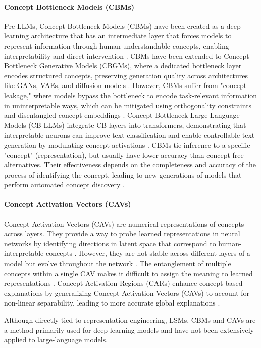 \paragraph{Concept Bottleneck Models (CBMs)} 

Pre-LLMs, Concept Bottleneck Models (CBMs) have been created as a deep learning architecture that has an intermediate layer that forces models to represent information through human-understandable concepts, enabling interpretability and direct intervention \cite{koh2020concept}. CBMs have been extended to Concept Bottleneck Generative Models (CBGMs), where a dedicated bottleneck layer encodes structured concepts, preserving generation quality across architectures like GANs, VAEs, and diffusion models \cite{ismail2023concept}. However, CBMs suffer from "concept leakage," where models bypass the bottleneck to encode task-relevant information in uninterpretable ways, which can be mitigated using orthogonality constraints and disentangled concept embeddings \cite{mahinpei2021promises, ismail2023concept}. Concept Bottleneck Large-Language Models (CB-LLMs) integrate CB layers into transformers, demonstrating that interpretable neurons can improve text classification and enable controllable text generation by modulating concept activations \cite{sun2024concept}. CBMs tie inference to a specific "concept" (representation), but usually have lower accuracy than concept-free alternatives. Their effectiveness depends on the completeness and accuracy of the process of identifying the concept, leading to new generations of models that perform automated concept discovery \cite{zarlenga2022concept, ismail2023concept, kim24}. 

\paragraph{Concept Activation Vectors (CAVs)}  

Concept Activation Vectors (CAVs) are numerical representations of concepts across layers. They provide a way to probe learned representations in neural networks by identifying directions in latent space that correspond to human-interpretable concepts \cite{nicolson24explain}. However, they are not stable across different layers of a model but evolve throughout the network \cite{nicolson24explain}. The entanglement of multiple concepts within a single CAV makes it difficult to assign the meaning to learned representations \cite{nicolson24explain, schmalwasser24}. Concept Activation Regions (CARs) enhance concept-based explanations by generalizing Concept Activation Vectors (CAVs) to account for non-linear separability, leading to more accurate global explanations \cite{crabbe2022concept}.  

Although directly tied to representation engineering, LSMs, CBMs and CAVs are a method primarily used for deep learning models \cite{desantis24, schmalwasser24} and have not been extensively applied to large-language models.